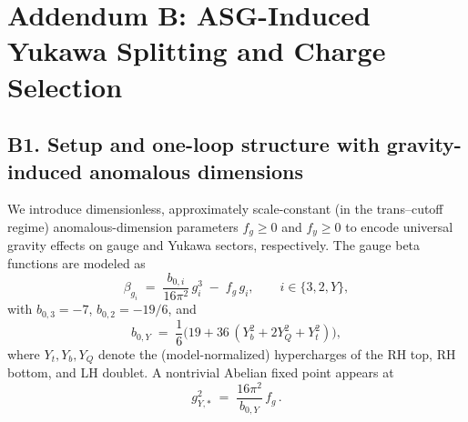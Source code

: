 \documentclass[11pt]{article}
\begin{document}
  \titlepageOpen

  \begin{abstract}


  \end{abstract}

  \titlepageClose
  \fi

  \ifdefined\standalonechapter
  \section{\papertitle}
  \else
  \fi


  \section*{Addendum B: ASG-Induced Yukawa Splitting and Charge Selection}

      \subsection*{B1. Setup and one-loop structure with gravity-induced anomalous dimensions}
          We introduce dimensionless, approximately scale-constant (in the trans–cutoff regime) anomalous-dimension parameters $f_g\!\ge\!0$ and $f_y\!\ge\!0$ to encode universal gravity effects on gauge and Yukawa sectors, respectively. The gauge beta functions are modeled as
          \begin{equation}
          \beta_{g_i} \;=\; \frac{b_{0,i}}{16\pi^2}\,g_i^3 \;-\; f_g\, g_i,
          \qquad i\in\{3,2,Y\},
          \end{equation}
          with $b_{0,3}=-7$, $b_{0,2}=-19/6$, and
          \begin{equation}
          b_{0,Y} \;=\; \frac{1}{6}\Big(19 + 36\,(Y_b^2 + 2Y_Q^2 + Y_t^2)\Big),
          \end{equation}
          where $Y_t, Y_b, Y_Q$ denote the (model-normalized) hypercharges of the RH top, RH bottom, and LH doublet. A nontrivial Abelian fixed point appears at
          \begin{equation}\tag{B1}
          g_{Y,*}^2 \;=\; \frac{16\pi^2}{b_{0,Y}}\, f_g \, .
          \end{equation}
\end{document}
